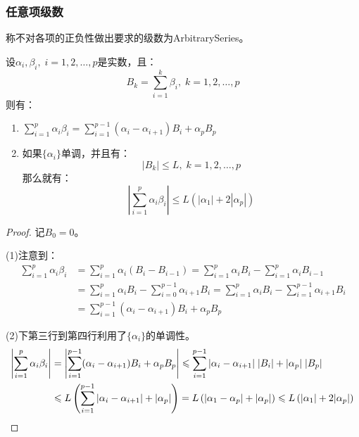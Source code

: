 \subsubsection{任意项级数}
\begin{definition}
	称不对各项的正负性做出要求的级数为\gls{ArbitrarySeries}。
\end{definition}
\begin{lemma}\label{lem:Abel}
	设$\alpha_i,\beta_i,\;i=1,2,\dots,p$是实数，且：
	\begin{equation*}
		B_k=\sum_{i=1}^k\beta_i,\;k=1,2,\dots,p
	\end{equation*}
	则有：
	\begin{enumerate}
		\item $\sum\limits_{i=1}^p\alpha_i\beta_i=\sum\limits_{i=1}^{p-1}(\alpha_i-\alpha_{i+1})B_i+\alpha_pB_p$
		\item 如果$\{\alpha_i\}$单调，并且有：
		\begin{equation*}
			|B_k|\leqslant L,\;k=1,2,\dots,p
		\end{equation*}
		那么就有：
		\begin{equation*}
			\left|\sum_{i=1}^p\alpha_i\beta_i\right|\leqslant L\left(|\alpha_1|+2|\alpha_p|\right)
		\end{equation*}
	\end{enumerate}
\end{lemma}
\begin{proof}
	记$B_0=0$。\par
	(1)注意到：
	\begin{align*}
		\sum_{i=1}^p\alpha_i\beta_i
		&=\sum_{i=1}^p\alpha_i(B_i-B_{i-1})=\sum_{i=1}^p\alpha_iB_i-\sum_{i=1}^p\alpha_iB_{i-1} \\
		&=\sum_{i=1}^p\alpha_iB_i-\sum_{i=0}^{p-1}\alpha_{i+1}B_{i}=\sum_{i=1}^p\alpha_iB_i-\sum_{i=1}^{p-1}\alpha_{i+1}B_{i} \\
		&=\sum_{i=1}^{p-1}(\alpha_i-\alpha_{i+1})B_i+\alpha_pB_p
	\end{align*}\par
	(2)下第三行到第四行利用了$\{\alpha_i\}$的单调性。
	\begin{align*}
		\left|\sum_{i=1}^p\alpha_i\beta_i\right|
		&=\left|\sum_{i=1}^{p-1}(\alpha_i-\alpha_{i+1})B_i+\alpha_pB_p\right|\leqslant\sum_{i=1}^{p-1}|\alpha_i-\alpha_{i+1}|\;|B_i|+|\alpha_p|\;|B_p| \\
		&\leqslant L\left(\sum_{i=1}^{p-1}|\alpha_i-\alpha_{i+1}|+|\alpha_p|\right)=L\left(|\alpha_1-\alpha_p|+|\alpha_p|\right)\leqslant L\left(|\alpha_1|+2|\alpha_p|\right)\qedhere
	\end{align*}
\end{proof}
